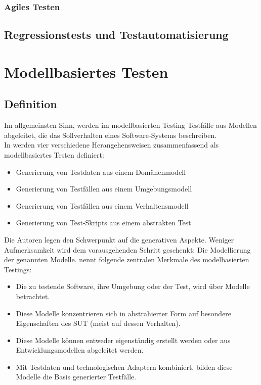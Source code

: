 \subsubsection{Agiles Testen}
\subsection{Regressionstests und Testautomatisierung}

\section{Modellbasiertes Testen}
\label{sec:mbt}
\subsection{Definition}
Im allgemeinsten Sinn, werden im modellbasierten Testing Testfälle aus Modellen abgeleitet, die das Sollverhalten eines Software-Systems beschreiben. \cite{sensler_testautomatisierung_2011}\\

In \cite{utting_practical_2007} werden vier verschiedene Herangehensweisen zusammenfassend als modellbasiertes Testen definiert:

\begin{itemize}
\item Generierung von Testdaten aus einem Domänenmodell
\item Generierung von Testfällen aus einem Umgebungsmodell
\item Generierung von Testfällen aus einem Verhaltensmodell
\item Generierung von Test-Skripts aus einem abstrakten Test
\end{itemize}

Die Autoren legen den Schwerpunkt auf die generativen Aspekte. Weniger Aufmerksamkeit wird dem vorausgehenden Schritt geschenkt: Die Modellierung der genannten Modelle. \cite{rossner_basiswissen_2010} nennt folgende  zentralen Merkmale des modelbasierten Testings:

\begin{itemize}
\item Die zu testende Software, ihre Umgebung oder der Test, wird über Modelle betrachtet.
\item Diese Modelle konzentrieren sich in abstrahierter Form auf besondere Eigenschaften des SUT (meist auf dessen Verhalten).
\item Diese Modelle können entweder eigenständig erstellt werden oder aus Entwicklungsmodellen abgeleitet werden.
\item Mit Testdaten und technologischen Adaptern kombiniert, bilden diese Modelle die Basis generierter Testfälle.
\end{itemize}

